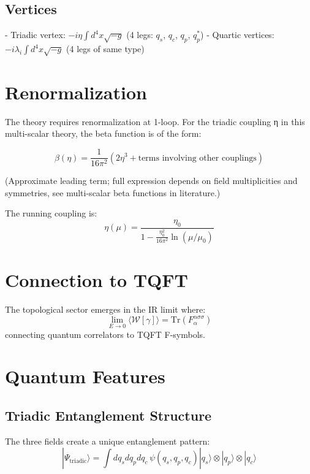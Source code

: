 \documentclass[openany]{memoir}
\theoremstyle{definition}
\theoremstyle{plain}
\theoremstyle{remark}
\begin{document}
\subsection{Vertices}
- Triadic vertex: $-i\eta \int d^4x \sqrt{-g}$ (4 legs: $q_s$, $q_c$, $q_p$, $q_p^*$)
- Quartic vertices: $-i\lambda_i \int d^4x \sqrt{-g}$ (4 legs of same type)

\section{Renormalization}

The theory requires renormalization at 1-loop. For the triadic coupling η in this multi-scalar theory, the beta function is of the form:

\begin{equation}
\beta(\eta) = \frac{1}{16\pi^2} \left( 2 \eta^3 + \text{terms involving other couplings} \right)
\end{equation}

(Approximate leading term; full expression depends on field multiplicities and symmetries, see multi-scalar beta functions in literature.)

The running coupling is:
\begin{equation}
\eta(\mu) = \frac{\eta_0}{1 - \frac{\eta_0^2}{16\pi^2} \ln(\mu/\mu_0)}
\end{equation}

\section{Connection to TQFT}

The topological sector emerges in the IR limit where:
\begin{equation}
\lim_{E \to 0} \langle \mathcal{W}[\gamma] \rangle = \text{Tr}(F_\alpha^{\alpha\sigma\sigma})
\end{equation}
connecting quantum correlators to TQFT F-symbols.

\section{Quantum Features}

\subsection{Triadic Entanglement Structure}
The three fields create a unique entanglement pattern:
\begin{equation}
|\Psi_{\text{triadic}}\rangle = \int dq_s dq_p dq_c \, \psi(q_s, q_p, q_c) |q_s\rangle \otimes |q_p\rangle \otimes |q_c\rangle
\end{equation}
\end{document}
